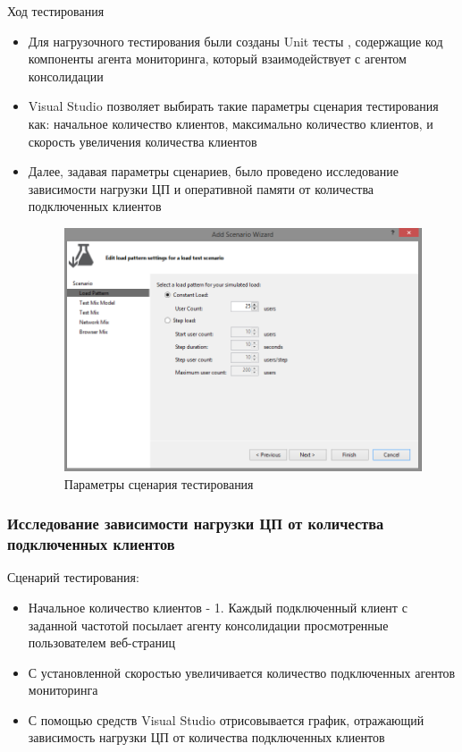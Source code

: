 \documentclass[russian, utf8, emptystyle]{eskdtext}
\begin{document}
Ход тестирования
\begin{itemize}
	\item Для нагрузочного тестирования были созданы Unit тесты \cite{unitTest}, содержащие код компоненты агента мониторинга, который взаимодействует с агентом консолидации
	\item Visual Studio позволяет выбирать такие параметры сценария тестирования как: начальное количество клиентов, максимально количество клиентов, и скорость увеличения
	количества клиентов
	\item Далее, задавая параметры сценариев, было проведено исследование зависимости нагрузки ЦП и оперативной памяти от количества подключенных клиентов
	 \begin{figure}[h]
	 	\begin{center}
	 		\includegraphics[width=14cm]{pic/test.png}
	 		\caption{Параметры сценария тестирования}
	 		\label{fig:low_sigma}
	 	\end{center}
	 \end{figure}
\end{itemize}
\subsubsection {Исследование зависимости нагрузки ЦП от количества подключенных клиентов}

Сценарий тестирования:
\begin{itemize}
	\item Начальное количество клиентов - 1. Каждый подключенный клиент с заданной частотой посылает агенту консолидации просмотренные пользователем веб-страниц
	\item С установленной скоростью увеличивается количество подключенных агентов мониторинга
	\item С помощью средств Visual Studio отрисовывается график, отражающий зависимость нагрузки ЦП от количества подключенных клиентов
\end{itemize}
\end{document}
